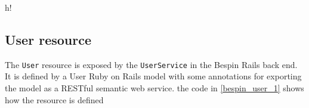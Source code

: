 \begin{table}{h!}
\noindent{}
\caption{Main resources in the Semantic Bespin application}
\label{bespin_arch_2}
\end{table}

\subsection{User resource}

The \texttt{User} resource is exposed by the \texttt{UserService} in the Bespin Rails back end. It is defined by a User
Ruby on Rails model with some annotations for exporting the model as a RESTful semantic web service. the code in
\ref{bespin_user_1} shows how the resource is defined

